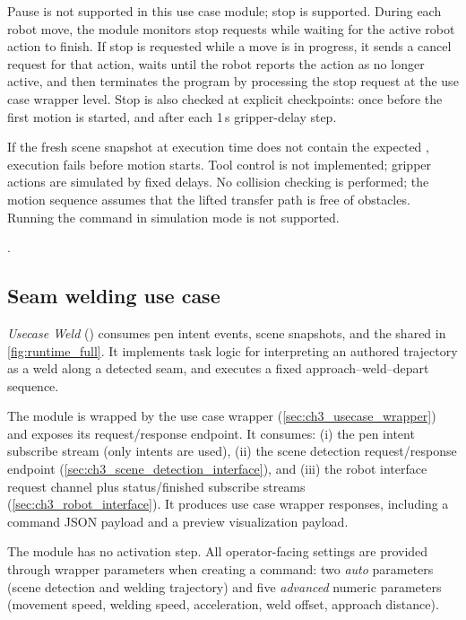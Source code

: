 Pause is not supported in this use case module; stop is supported.
During each robot move, the module monitors stop requests while waiting for the active robot action to finish.
If stop is requested while a move is in progress, it sends a cancel request for that action, waits until the robot reports the action as no longer active, and then terminates the program by processing the stop request at the use case wrapper level.
Stop is also checked at explicit checkpoints: once before the first motion is started, and after each 1\,s gripper-delay step.

If the fresh scene snapshot at execution time does not contain the expected , execution fails before motion starts.
Tool control is not implemented; gripper actions are simulated by fixed delays.
No collision checking is performed; the motion sequence assumes that the lifted transfer path is free of obstacles.
Running the command in simulation mode is not supported.

.

\subsection{Seam welding use case}
\label{subsec:ch4_usecase_weld}

\emph{Usecase Weld} () consumes pen intent events, scene snapshots, and the shared  in \autoref{fig:runtime_full}. It implements task logic for interpreting an authored trajectory as a weld along a detected seam, and executes a fixed approach--weld--depart sequence.

The module is wrapped by the use case wrapper (\autoref{sec:ch3_usecase_wrapper}) and exposes its request/response endpoint.
It consumes:
(i) the pen intent subscribe stream (only  intents are used),
(ii) the scene detection request/response endpoint (\autoref{sec:ch3_scene_detection_interface}), and
(iii) the robot interface request channel plus status/finished subscribe streams (\autoref{sec:ch3_robot_interface}).
It produces use case wrapper responses, including a command JSON payload and a preview visualization payload.

The module has no activation step. All operator-facing settings are provided through wrapper parameters when creating a command: two \emph{auto} parameters (scene detection and welding trajectory) and five \emph{advanced} numeric parameters (movement speed, welding speed, acceleration, weld offset, approach distance).

